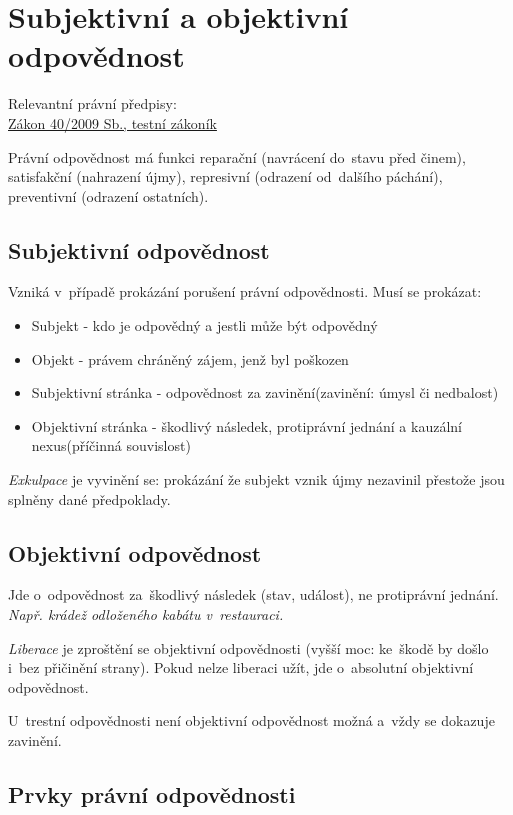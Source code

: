 \clearpage
\section{Subjektivní a objektivní odpovědnost}

{}Relevantní právní předpisy:
\\\href{https://www.zakonyprolidi.cz/cs/2009-40}{Zákon 40/2009 Sb., testní zákoník}

Právní odpovědnost má funkci reparační (navrácení do~stavu před činem), satisfakční (nahrazení újmy), represivní (odrazení od~dalšího páchání), preventivní (odrazení ostatních).


\subsection{Subjektivní odpovědnost}

Vzniká v~případě prokázání porušení právní odpovědnosti.
Musí se prokázat:
\begin{itemize}
    \item Subjekt - kdo je odpovědný a jestli může být odpovědný
    \item Objekt - právem chráněný zájem, jenž byl poškozen
    \item Subjektivní stránka - odpovědnost za zavinění(zavinění: úmysl či nedbalost)
    \item Objektivní stránka - škodlivý následek, protiprávní jednání a kauzální nexus(příčinná souvislost)
\end{itemize}
\emph{Exkulpace} je vyvinění se: prokázání že subjekt vznik újmy nezavinil přestože jsou splněny dané předpoklady.


\subsection{Objektivní odpovědnost}


Jde o~odpovědnost za~škodlivý následek (stav, událost), ne protiprávní jednání.
\emph{Např. krádež odloženého kabátu v~restauraci.}

\emph{Liberace} je zproštění se objektivní odpovědnosti (vyšší moc: ke~škodě by došlo i~bez přičinění strany).
Pokud nelze liberaci užít, jde o~absolutní objektivní odpovědnost.

U~trestní odpovědnosti není objektivní odpovědnost možná a~vždy se dokazuje zavinění.


\subsection{Prvky právní odpovědnosti}

